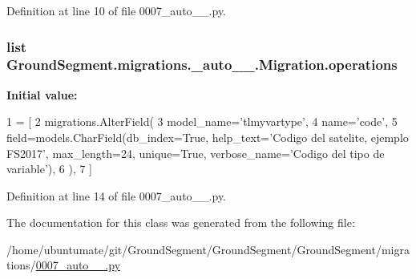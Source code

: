 Definition at line 10 of file 0007\+\_\+auto\+\_\+\_.\+py.

\hypertarget{class_ground_segment_1_1migrations_1_10007__auto__20161126__1841_1_1_migration_a9017cc6c49a17d1c4461672a4f3300e8}{}
\subsubsection[{operations}]{\setlength{\rightskip}{0pt plus 5cm}list Ground\+Segment.\+migrations.\+\_\+auto\+\_\+\_.\+Migration.\+operations\hspace{0.3cm}{\ttfamily [static]}}\label{class_ground_segment_1_1migrations_1_10007__auto__20161126__1841_1_1_migration_a9017cc6c49a17d1c4461672a4f3300e8}
{\bfseries Initial value\+:}
\begin{DoxyCode}
1 = [
2         migrations.AlterField(
3             model\_name=\textcolor{stringliteral}{'tlmyvartype'},
4             name=\textcolor{stringliteral}{'code'},
5             field=models.CharField(db\_index=\textcolor{keyword}{True}, help\_text=\textcolor{stringliteral}{'Codigo del satelite, ejemplo FS2017'}, 
      max\_length=24, unique=\textcolor{keyword}{True}, verbose\_name=\textcolor{stringliteral}{'Codigo del tipo de variable'}),
6         ),
7     ]
\end{DoxyCode}


Definition at line 14 of file 0007\+\_\+auto\+\_\+\_.\+py.



The documentation for this class was generated from the following file\+:\begin{DoxyCompactItemize}
\item 
/home/ubuntumate/git/\+Ground\+Segment/\+Ground\+Segment/\+Ground\+Segment/migrations/\hyperlink{0007__auto__20161126__1841_8py}{0007\+\_\+auto\+\_\+\_.\+py}\end{DoxyCompactItemize}
